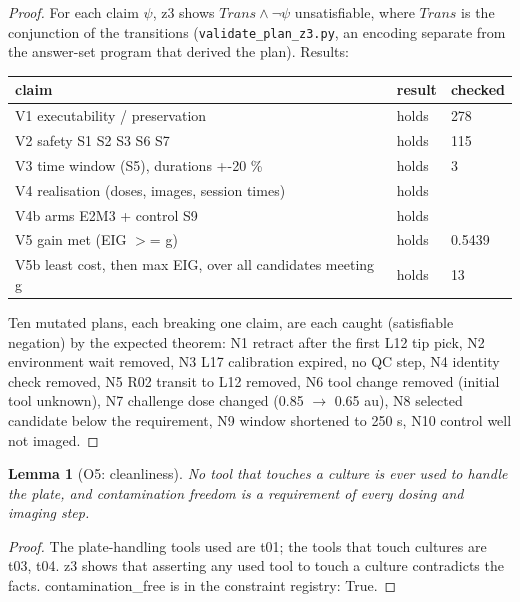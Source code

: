\documentclass[10pt,a4paper]{article}
\theoremstyle{plain}\newtheorem{theorem}{Theorem}\newtheorem{lemma}{Lemma}\newtheorem{corollary}{Corollary}
\theoremstyle{definition}\newtheorem{definition}{Definition}\newtheorem{assumption}{Assumption}
\theoremstyle{remark}\newtheorem*{remark}{Remark}
\begin{document}
\begin{proof}
For each claim $\psi$, z3 shows $\mathit{Trans} \wedge \neg\psi$ unsatisfiable, where $\mathit{Trans}$ is the
conjunction of the transitions (\texttt{validate\_plan\_z3.py}, an encoding separate from the answer-set program that
derived the plan). Results:
\begin{center}\small\begin{tabularx}{\linewidth}{@{}Xll@{}}\toprule claim & result & checked \\\midrule
V1 executability / preservation & \textcolor{green!40!black}{holds} & 278 \\
V2 safety S1 S2 S3 S6 S7 & \textcolor{green!40!black}{holds} & 115 \\
V3 time window (S5), durations +-20 \% & \textcolor{green!40!black}{holds} & 3 \\
V4 realisation (doses, images, session times) & \textcolor{green!40!black}{holds} &  \\
V4b arms E2M3 + control S9 & \textcolor{green!40!black}{holds} &  \\
V5 gain met (EIG $>$= g) & \textcolor{green!40!black}{holds} & 0.5439 \\
V5b least cost, then max EIG, over all candidates meeting g & \textcolor{green!40!black}{holds} & 13
\\\bottomrule\end{tabularx}\end{center}
Ten mutated plans, each breaking one claim, are each caught (satisfiable negation) by the expected theorem: N1 retract after the first L12 tip pick, N2 environment wait removed, N3 L17 calibration expired, no QC step, N4 identity check removed, N5 R02 transit to L12 removed, N6 tool change removed (initial tool unknown), N7 challenge dose changed (0.85 $\to$ 0.65 au), N8 selected candidate below the requirement, N9 window shortened to 250 s, N10 control well not imaged.
\end{proof}

\begin{lemma}[O5: cleanliness]
No tool that touches a culture is ever used to handle the plate, and contamination freedom is a requirement of every
dosing and imaging step.
\end{lemma}
\begin{proof}
The plate-handling tools used are t01; the tools that touch cultures are t03, t04. z3 shows that asserting any used tool to touch a culture contradicts the facts. contamination\_free is in the constraint registry: True.
\end{proof}
\end{document}
